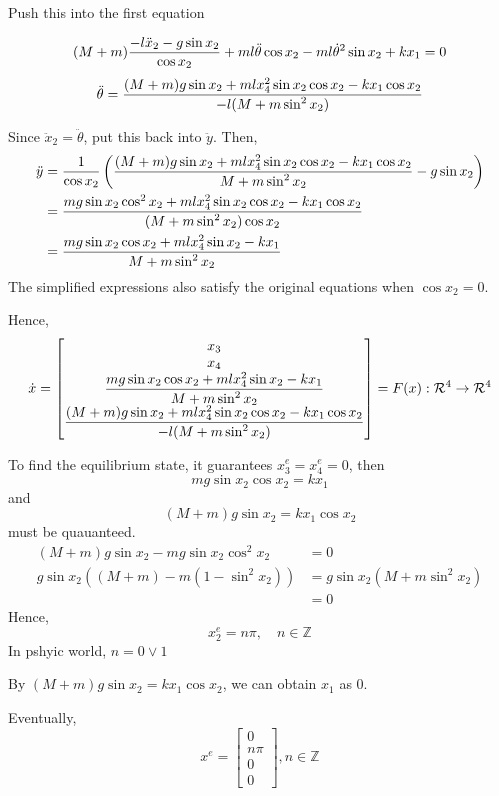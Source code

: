 \documentclass[12pt,a4paper]{article}
\begin{document}
Push this into the first equation

\[
(M + m ) { -l\ddot x_2  -g\sin x_2 \over \cos x_2} + ml\ddot\theta\cos x_2 - ml \dot \theta^2\sin x_2+kx_1 = 0
\]
\[
\ddot \theta = { (M+m)g\sin x_2 + ml x_4^2\sin x_2\cos x_2 - kx_1\cos x_2 \over -l(M + m\sin^2 x_2) }
\]

Since $\ddot x_2 = \ddot\theta$, put this back into $\ddot y$. Then,
\[
\begin{aligned}
\ddot y
&= {1\over\cos x_2}\left(
{(M+m)g\sin x_2 + ml x_4^2\sin x_2\cos x_2 - kx_1\cos x_2
\over M+m\sin^2 x_2} - g\sin x_2\right) \\
&= {mg\sin x_2\cos^2 x_2 + ml x_4^2\sin x_2\cos x_2 - kx_1\cos x_2
\over (M+m\sin^2 x_2)\cos x_2} \\
&= {mg\sin x_2\cos x_2 + ml x_4^2\sin x_2 - kx_1
\over M+m\sin^2 x_2}
\end{aligned}
\]
The simplified expressions also satisfy the original equations when $\cos x_2=0$.

Hence, 
\[
\dot x = \displaystyle\begin{bmatrix}
	x_3 \\ x_4 \\
	\displaystyle{mg\sin x_2\cos x_2 + ml x_4^2\sin x_2 - kx_1 \over M+m\sin^2 x_2} \\
	 \displaystyle{ (M+m)g\sin x_2 + ml x_4^2\sin x_2\cos x_2 - kx_1\cos x_2 \over -l(M + m\sin^2 x_2) }
\end{bmatrix} = F(x) : \mathcal R^4\to\mathcal R^4
\]

To find the equilibrium state, it guarantees $x^e_3 = x^e_4 = 0$, then
\[
	mg\sin x_2 \cos x_2 = kx_1 
\] and 
\[
	(M + m)g\sin x_2 = kx_1\cos x_2
\]
must be quauanteed.
\[
\begin{aligned}
(M + m)g\sin x_2 - mg\sin x_2 \cos^2 x_2 &= 0 \\
g\sin x_2  ((M + m) - m(1 - \sin^2 x_2) ) &= g\sin x_2 (M + m\sin ^2 x_2) \\ &= 0
\end{aligned}
\]
Hence, 
\[
x_2^e = n\pi, \quad n \in \mathbb Z
\]
In pshyic world, $n = 0 \lor 1$ 

By $(M + m)g\sin x_2 = kx_1\cos x_2$, we can obtain $x_1$ as $0$.

Eventually,
\[
x^e = \begin{bmatrix}
	0 \\ n\pi \\ 0 \\0
\end{bmatrix}, n \in \mathbb Z
\]
\end{document}
